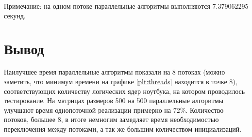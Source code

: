 \clearpage

Примечание: на одном потоке параллельные алгоритмы выполняются 7.379062295 секунд.

\section*{Вывод}

Наилучшее время параллельные алгоритмы показали на 8 потоках (можно заметить, что минимум времени на графике \ref{plt:threads} находится в точке 8), соответствующих количеству логических ядер ноутбука, на котором проводилось тестирование. На матрицах размеров 500 на 500 параллельные алгоритмы улучшают время однопоточной реализации примерно на $72\%$.
Количество потоков, большее 8, в итоге немногим замедляет время необходимостью переключения между потоками, а так же большим количеством инициализаций.
